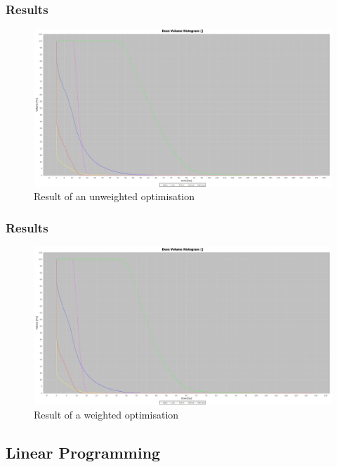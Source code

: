 \documentclass{beamer}
\begin{document}
\begin{frame}
\frametitle{Results}
	\begin{figure}[h]
	\centering
	\includegraphics[width=1\textwidth]{pictures/body1_w1-4-2-3-2.png}
	\caption{Result of an unweighted optimisation}
	\end{figure}
 
 
\end{frame}  

\begin{frame}
\frametitle{Results}
	\begin{figure}[h]
	\centering
	\includegraphics[width=1\textwidth]{pictures/body1_w1-4-2-70-20.png}
	\caption{Result of a weighted optimisation}
	\end{figure}
 
 
\end{frame}  
 
 \subsection{Linear Programming}
 \frame{\tableofcontents[currentsubsection]}
\end{document}
